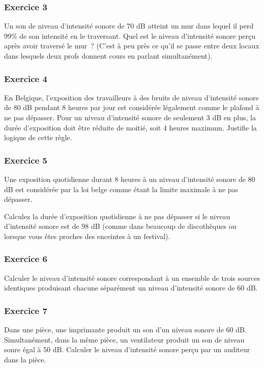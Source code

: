 \subsubsection*{Exercice 3}

Un son de niveau d'intensité sonore de 70 dB atteint un mur dans
lequel il perd 99\% de son intensité en le traversant. Quel est le
niveau d'intensité sonore perçu après avoir traversé le mur~? (C'est à
peu près ce qu'il se passe entre deux locaux dans lesquels deux profs
donnent cours en parlant simultanément).

\subsubsection*{Exercice 4}
En Belgique, l'exposition des travailleurs à des bruits de niveau
d'intensité sonore de 80 dB pendant 8 heures par jour est considérée
légalement comme le plafond à ne pas dépasser. Pour un niveau
d'intensité sonore de seulement 3 dB en plus, la durée d'exposition doit
être réduite de moitié, soit 4 heures maximum. Justifie la logique de
cette règle.

\subsubsection*{Exercice 5}
 Une exposition quotidienne durant 8 heures à un niveau d'intensité
sonore de 80 dB est considérée par la loi belge comme étant la limite
maximale à ne pas dépasser.

Calculez la durée d'exposition quotidienne à ne pas dépasser si le
niveau d'intensité sonore est de 98 dB (comme dans beaucoup de
discothèques ou lorsque vous êtes proches des enceintes à un festival).

\subsubsection*{Exercice 6}

Calculer le niveau d'intensité sonore correspondant à un ensemble de
trois sources identiques produisant chacune séparément un niveau
d'intensité sonore de 60 dB.

\subsubsection*{Exercice 7}
Dans une pièce, une imprimante produit un son d'un niveau sonore de
60 dB. Simultanément, dans la même pièce, un ventilateur produit un son
de niveau sonre égal à 50 dB. Calculer le niveau d'intensité sonore
perçu par un auditeur dans la pièce.

